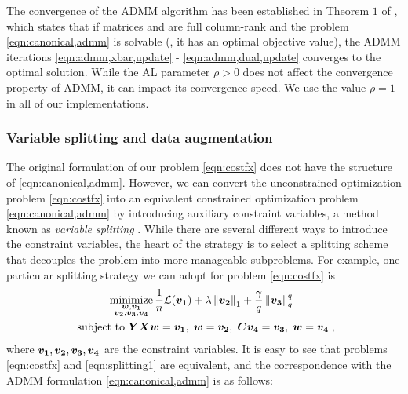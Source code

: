 The convergence of the ADMM algorithm has been established in Theorem $1$ of \cite{Mota:2011}, which states that if matrices \Abar and \Bbar are full column-rank and the problem \eqref{eqn:canonical,admm} is solvable (\ie, it has an optimal objective value), the ADMM iterations \eqref{eqn:admm,xbar,update} - \eqref{eqn:admm,dual,update} converges to the optimal solution.
While the AL parameter $\rho>0$ does not affect the convergence property of ADMM, it can impact its convergence speed.
We use the value $\rho=1$ in all of our implementations.

\subsubsection{Variable splitting and data augmentation}
\label{subsec:var,split}
The original formulation of our problem \eqref{eqn:costfx} does not have the structure of \eqref{eqn:canonical,admm}.
However, we can convert the unconstrained optimization problem \eqref{eqn:costfx} into an equivalent constrained optimization problem \eqref{eqn:canonical,admm} by introducing auxiliary constraint variables, a method known as \emph{variable splitting} \citep{Afonso:2010}.  
While there are several different ways to introduce the constraint variables, the heart of the strategy is to select a splitting scheme that decouples the problem into more manageable subproblems.
For example, one particular splitting strategy we can adopt for problem \eqref{eqn:costfx} is
\begin{equation}
	\begin{array}{c}
		\dstyle\minimize{\substack{\w,\va \\ \vb,\vc,\vd}} 
			\frac{1}{n}\Loss(\va)+\lambda\norm{\vb}_1+\frac{\gamma}{q}\norm{\vc}^q_q \; \; 
			\vspace{0.01\linewidth}\\
		\text{ subject to }  \YXw =\va, \; \w=\vb, \; \C\vd=\vc, \;  \w=\vd \;, 
	\end{array}
	\label{eqn:splitting1}
\end{equation}
where ${\bm{v_1}},{\bm{v_2}},{\bm{v_3}},{\bm{v_4}}$ are the constraint variables.
It is easy to see that problems \eqref{eqn:costfx} and \eqref{eqn:splitting1} are equivalent, and the correspondence with the ADMM formulation \eqref{eqn:canonical,admm} is as follows:
